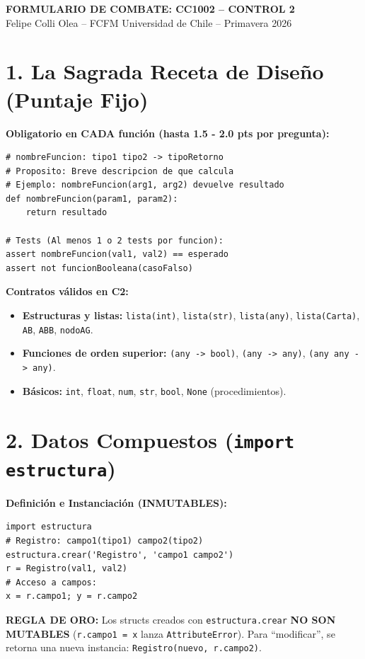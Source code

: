 \documentclass[8pt,twocolumn]{extarticle}
\begin{document}
\begin{center}
    \textbf{\normalsize FORMULARIO DE COMBATE: CC1002 -- CONTROL 2} \\
    \tiny Felipe Colli Olea -- FCFM Universidad de Chile -- Primavera 2026
\end{center}

\section{1. La Sagrada Receta de Diseño (Puntaje Fijo)}
\textbf{Obligatorio en CADA función (hasta 1.5 - 2.0 pts por pregunta):}
\begin{verbatim}
# nombreFuncion: tipo1 tipo2 -> tipoRetorno
# Proposito: Breve descripcion de que calcula
# Ejemplo: nombreFuncion(arg1, arg2) devuelve resultado
def nombreFuncion(param1, param2):
    return resultado

# Tests (Al menos 1 o 2 tests por funcion):
assert nombreFuncion(val1, val2) == esperado
assert not funcionBooleana(casoFalso)
\end{verbatim}
\textbf{Contratos válidos en C2:}
\begin{itemize}
    \item \textbf{Estructuras y listas:} \texttt{lista(int)}, \texttt{lista(str)}, \texttt{lista(any)}, \texttt{lista(Carta)}, \texttt{AB}, \texttt{ABB}, \texttt{nodoAG}.
    \item \textbf{Funciones de orden superior:} \texttt{(any -> bool)}, \texttt{(any -> any)}, \texttt{(any any -> any)}.
    \item \textbf{Básicos:} \texttt{int}, \texttt{float}, \texttt{num}, \texttt{str}, \texttt{bool}, \texttt{None} (procedimientos).
\end{itemize}

\section{2. Datos Compuestos (\texttt{import estructura})}
\textbf{Definición e Instanciación (INMUTABLES):}
\begin{verbatim}
import estructura
# Registro: campo1(tipo1) campo2(tipo2)
estructura.crear('Registro', 'campo1 campo2')
r = Registro(val1, val2)
# Acceso a campos:
x = r.campo1; y = r.campo2
\end{verbatim}
\textbf{REGLA DE ORO:} Los structs creados con \texttt{estructura.crear} \textbf{NO SON MUTABLES} (\texttt{r.campo1 = x} lanza \texttt{AttributeError}). Para ``modificar'', se retorna una nueva instancia: \texttt{Registro(nuevo, r.campo2)}.
\end{document}

